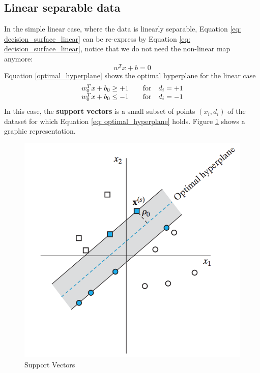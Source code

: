 \documentclass[11pt]{article}
\begin{document}
\subsection{Linear separable data}
In the simple linear case, where the data is linearly separable, Equation \ref{eq: decision_surface_linear} can be re-express by Equation \ref{eq: decision_surface_linear}, notice that we do not need the non-linear map anymore:
\begin{equation}
    w^Tx + b= 0	
    \label{eq: decision_surface_linear}
\end{equation}
Equation \ref{optimal_hyperplane} shows the optimal hyperplane for the linear case
\begin{equation}
    \begin{array}{r c l}
w^T_0x + b_0 \ge +1 && \text{for} \quad d_i = + 1  \\
w^T_0x + b_0  \le -1 && \text{for} \quad   d_i = - 1 
\end{array}
   \label{eq: optimal_hyperplane}
\end{equation}
In this case, the \textbf{support vectors} is a small subset of points $(x_i,d_i)$ of the dataset for which Equation \ref{eq: optimal_hyperplane} holds. Figure \ref{fig: support_vector} shows a graphic representation. 
\begin{figure}[H]
\centering
\includegraphics[scale=0.5]{images/support_vector}
\caption{Support Vectors}
\label{fig: support_vector}
\end{figure}
\end{document}
